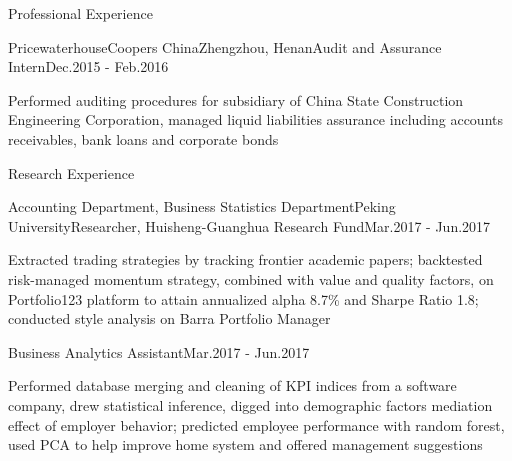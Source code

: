 \documentclass{resume02} %
\begin{document}
\begin{rSection}{Professional Experience}

\begin{rSubsection}{PricewaterhouseCoopers China}{Zhengzhou, Henan}{Audit and Assurance Intern}{Dec.2015 - Feb.2016}
\item Performed auditing procedures for subsidiary of China State Construction Engineering Corporation, managed liquid liabilities assurance including accounts receivables, bank loans and corporate bonds
\end{rSubsection}

\end{rSection}



\begin{rSection}{Research Experience}

\begin{rSubsection}{Accounting Department, Business Statistics Department}{Peking University}{Researcher, Huisheng-Guanghua Research Fund}{Mar.2017 - Jun.2017}
\item Extracted trading strategies by tracking frontier academic papers; backtested risk-managed momentum strategy, combined with value and quality factors, on Portfolio123 platform to attain annualized alpha 8.7\% and Sharpe Ratio 1.8; conducted style analysis on Barra Portfolio Manager
\end{rSubsection}
\vspace{-1.6em}
\begin{rSubsection}{}{}{Business Analytics Assistant}{Mar.2017 - Jun.2017}
\item Performed database merging and cleaning of KPI indices from a software company, drew statistical inference, digged into demographic factors mediation effect of employer behavior; predicted employee performance with random forest, used PCA to help improve home system and offered management suggestions
\end{rSubsection}

\end{rSection}

\end{document}
